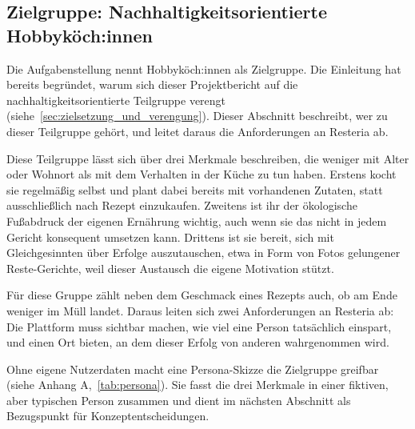 \subsection{Zielgruppe: Nachhaltigkeitsorientierte Hobbyköch:innen}\label{sec:zielgruppe}

Die Aufgabenstellung nennt Hobbyköch:innen als Zielgruppe. Die Einleitung hat bereits begründet, warum sich dieser Projektbericht auf die nachhaltigkeitsorientierte Teilgruppe verengt (siehe~\autoref{sec:zielsetzung_und_verengung}). Dieser Abschnitt beschreibt, wer zu dieser Teilgruppe gehört, und leitet daraus die Anforderungen an Resteria ab.

Diese Teilgruppe lässt sich über drei Merkmale beschreiben, die weniger mit Alter oder Wohnort als mit dem Verhalten in der Küche zu tun haben. Erstens kocht sie regelmäßig selbst und plant dabei bereits mit vorhandenen Zutaten, statt ausschließlich nach Rezept einzukaufen. Zweitens ist ihr der ökologische Fußabdruck der eigenen Ernährung wichtig, auch wenn sie das nicht in jedem Gericht konsequent umsetzen kann. Drittens ist sie bereit, sich mit Gleichgesinnten über Erfolge auszutauschen, etwa in Form von Fotos gelungener Reste-Gerichte, weil dieser Austausch die eigene Motivation stützt.

Für diese Gruppe zählt neben dem Geschmack eines Rezepts auch, ob am Ende weniger im Müll landet. Daraus leiten sich zwei Anforderungen an Resteria ab: Die Plattform muss sichtbar machen, wie viel eine Person tatsächlich einspart, und einen Ort bieten, an dem dieser Erfolg von anderen wahrgenommen wird.

Ohne eigene Nutzerdaten macht eine Persona-Skizze die Zielgruppe greifbar (siehe Anhang A,~\autoref{tab:persona}). Sie fasst die drei Merkmale in einer fiktiven, aber typischen Person zusammen und dient im nächsten Abschnitt als Bezugspunkt für Konzeptentscheidungen.
